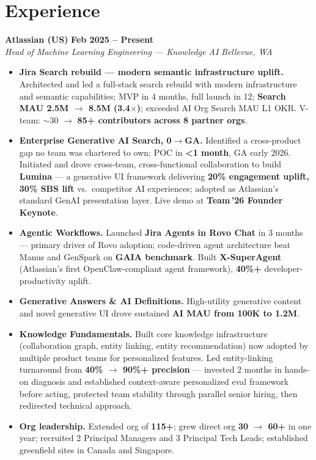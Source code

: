 \documentclass[10.5pt,letterpaper]{article}
\newcommand{\role}[4]{%
  \noindent\textbf{#1} \hfill \textbf{#3}\\
  \textit{#2} \hfill \textit{#4}\par\vspace{2pt}}
\begin{document}
\section*{Experience}

\role{Atlassian (US)}{Head of Machine Learning Engineering --- Knowledge AI}{Feb 2025 -- Present}{Bellevue, WA}
\begin{itemize}
  \item \textbf{Jira Search rebuild --- modern semantic infrastructure uplift.} Architected and led a full-stack search rebuild with modern infrastructure and semantic capabilities; MVP in 4 months, full launch in 12; \textbf{Search MAU 2.5M $\to$ 8.5M (3.4$\times$)}; exceeded AI Org Search MAU L1 OKR. V-team: $\sim$30 $\to$ \textbf{85+ contributors across 8 partner orgs}.
  \item \textbf{Enterprise Generative AI Search, 0$\to$GA.} Identified a cross-product gap no team was chartered to own; POC in \textbf{<1 month}, GA early 2026. Initiated and drove cross-team, cross-functional collaboration to build \textbf{Lumina} --- a generative UI framework delivering \textbf{20\% engagement uplift, 30\% SBS lift} vs.\ competitor AI experiences; adopted as Atlassian's standard GenAI presentation layer. Live demo at \textbf{Team\,'26 Founder Keynote}.
  \item \textbf{Agentic Workflows.} Launched \textbf{Jira Agents in Rovo Chat} in 3 months --- primary driver of Rovo adoption; code-driven agent architecture beat Manus and GenSpark on \textbf{GAIA benchmark}. Built \textbf{X-SuperAgent} (Atlassian's first OpenClaw-compliant agent framework), \textbf{40\%+} developer-productivity uplift.
  \item \textbf{Generative Answers \& AI Definitions.} High-utility generative content and novel generative UI drove sustained \textbf{AI MAU from 100K to 1.2M}.
  \item \textbf{Knowledge Fundamentals.} Built core knowledge infrastructure (collaboration graph, entity linking, entity recommendation) now adopted by multiple product teams for personalized features. Led entity-linking turnaround from \textbf{40\% $\to$ 90\%+ precision} --- invested 2 months in hands-on diagnosis and established context-aware personalized eval framework before acting, protected team stability through parallel senior hiring, then redirected technical approach.
  \item \textbf{Org leadership.} Extended org of \textbf{115+}; grew direct org \textbf{30 $\to$ 60+} in one year; recruited 2 Principal Managers and 3 Principal Tech Leads; established greenfield sites in Canada and Singapore.
\end{itemize}
\end{document}
